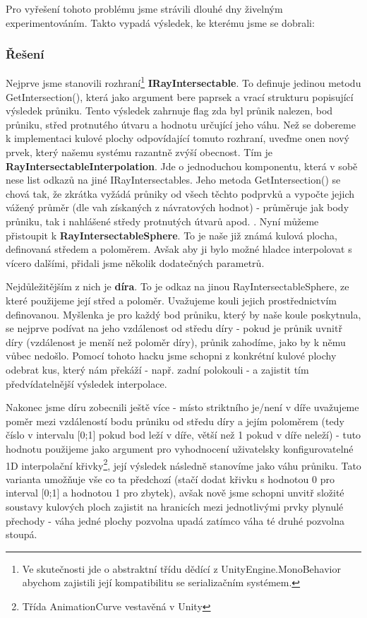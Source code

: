 Pro vyřešení tohoto problému jsme strávili dlouhé dny živelným experimentováním. Takto vypadá výsledek, ke kterému jsme se dobrali:

\subsubsection*{Řešení} \label{resultSwordControlsSolutionSubsubsection}

Nejprve jsme stanovili rozhraní\footnote{Ve skutečnosti jde o abstraktní třídu dědící z UnityEngine.MonoBehavior abychom zajistili její kompatibilitu se serializačním systémem.} \textbf{IRayIntersectable}. To definuje jedinou metodu GetIntersection(), která jako argument bere paprsek a vrací strukturu popisující výsledek průniku. Tento výsledek zahrnuje flag zda byl průnik nalezen, bod průniku, střed protnutého útvaru a hodnotu určující jeho váhu.
\bigbreak
Než se dobereme k implementaci kulové plochy odpovídající tomuto rozhraní, uveďme onen nový prvek, který našemu systému razantně zvýší obecnost. Tím je \textbf{RayIntersectableInterpolation}. Jde o jednoduchou komponentu, která v sobě nese list odkazů na jiné IRayIntersectables. Jeho metoda GetIntersection() se chová tak, že zkrátka vyžádá průniky od všech těchto podprvků a vypočte jejich vážený průměr (dle vah získaných z návratových hodnot) - průměruje jak body průniku, tak i nahlášené středy protnutých útvarů apod. .
\bigbreak
Nyní můžeme přistoupit k \textbf{RayIntersectableSphere}. To je naše již známá kulová plocha, definovaná středem a poloměrem. Avšak aby ji bylo možné hladce interpolovat s vícero dalšími, přidali jsme několik dodatečných parametrů.

Nejdůležitějším z nich je \textbf{díra}. To je odkaz na jinou RayIntersectableSphere, ze které použijeme její střed a poloměr. Uvažujeme kouli jejich prostřednictvím definovanou. Myšlenka je pro každý bod průniku, který by naše koule poskytnula, se nejprve podívat na jeho vzdálenost od středu díry - pokud je průnik uvnitř díry (vzdálenost je menší než poloměr díry), průnik zahodíme, jako by k němu vůbec nedošlo. Pomocí tohoto hacku jsme schopni z konkrétní kulové plochy odebrat kus, který nám překáží - např. zadní polokouli - a zajistit tím předvídatelnější výsledek interpolace.

Nakonec jsme díru zobecnili ještě více - místo striktního je/není v díře uvažujeme poměr mezi vzdáleností bodu průniku od středu díry a jejím poloměrem (tedy číslo v intervalu [0;1] pokud bod leží v díře, větší než 1 pokud v díře neleží) - tuto hodnotu použijeme jako argument pro vyhodnocení uživatelsky konfigurovatelné 1D interpolační křivky\footnote{Třída AnimationCurve vestavěná v Unity}, její výsledek následně stanovíme jako váhu průniku. Tato varianta umožňuje vše co ta předchozí (stačí dodat křivku s hodnotou 0 pro interval [0;1] a hodnotou 1 pro zbytek), avšak nově jsme schopni unvitř složité soustavy kulových ploch zajistit na hranicích mezi jednotlivými prvky plynulé přechody - váha jedné plochy pozvolna upadá zatímco váha té druhé pozvolna stoupá.


